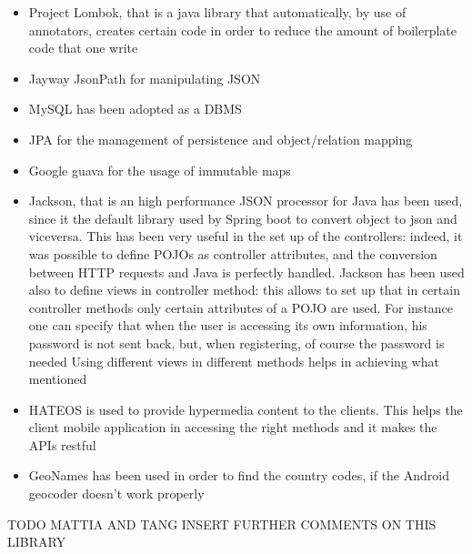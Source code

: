 \begin{itemize}
\item Project Lombok, that is a java library that automatically, by use of annotators, creates certain code in order to reduce the amount
of boilerplate code that one write 
\item Jayway JsonPath for manipulating JSON 
\item MySQL has been adopted as a DBMS
\item JPA for the management of persistence and object/relation mapping
\item Google guava for the usage of immutable maps
\item Jackson, that is an high performance JSON processor for Java has been used, since it the default library used by Spring boot 
to convert object to json and viceversa. 
This has been very useful in the set up of the controllers: indeed, it was possible to define POJOs as controller attributes, and the conversion between HTTP requests and Java is perfectly handled. 
Jackson has been used also to define views in controller method: this allows to set up that in certain controller methods only certain attributes of a POJO are used. 
For instance one can specify that when the user is accessing its own information, his password is not sent back, but, when registering, of course the password is needed
Using different views in different methods helps in achieving what mentioned 
\item HATEOS is used to provide hypermedia content to the clients. This helps the client mobile application in accessing the right methods 
and it makes the APIs restful
\item GeoNames has been used in order to find the country codes, if the Android geocoder doesn't work properly
\end{itemize}
TODO MATTIA AND TANG INSERT FURTHER COMMENTS ON THIS LIBRARY
